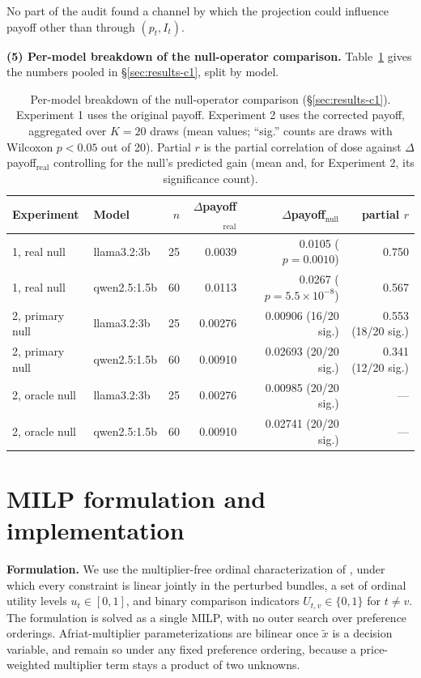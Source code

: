 \documentclass{article}
\begin{document}
No part of the audit found a channel by which the projection could influence payoff other than
through $(p_t, I_t)$.

\textbf{(5) Per-model breakdown of the null-operator comparison.} Table~\ref{tab:permodel} gives
the numbers pooled in \S\ref{sec:results-c1}, split by model.

\begin{table}[h]
\centering
\footnotesize
\caption{Per-model breakdown of the null-operator comparison (\S\ref{sec:results-c1}).
Experiment 1 uses the original payoff. Experiment 2 uses the corrected payoff, aggregated over
$K=20$ draws (mean values; ``sig.'' counts are draws with Wilcoxon $p<0.05$ out of 20). Partial
$r$ is the partial correlation of dose against $\Delta$payoff$_{\mathrm{real}}$ controlling for
the null's predicted gain (mean and, for Experiment 2, its significance count).}
\label{tab:permodel}
\begin{tabular}{llrrrr}
\toprule
Experiment & Model & $n$ & $\Delta$payoff$_{\mathrm{real}}$ & $\Delta$payoff$_{\mathrm{null}}$ & partial $r$ \\
\midrule
1, real null      & llama3.2:3b  & 25 & 0.0039  & 0.0105 ($p=0.0010$)              & 0.750 \\
1, real null      & qwen2.5:1.5b & 60 & 0.0113  & 0.0267 ($p=5.5{\times}10^{-8}$)  & 0.567 \\
\midrule
2, primary null   & llama3.2:3b  & 25 & 0.00276 & 0.00906 (16/20 sig.)             & 0.553 (18/20 sig.) \\
2, primary null   & qwen2.5:1.5b & 60 & 0.00910 & 0.02693 (20/20 sig.)             & 0.341 (12/20 sig.) \\
\midrule
2, oracle null    & llama3.2:3b  & 25 & 0.00276 & 0.00985 (20/20 sig.)             & --- \\
2, oracle null    & qwen2.5:1.5b & 60 & 0.00910 & 0.02741 (20/20 sig.)             & --- \\
\bottomrule
\end{tabular}
\end{table}

\section{MILP formulation and implementation}
\label{app:method-detail}

\textbf{Formulation.} We use the multiplier-free ordinal characterization of
\citet{demuynck2023computing}, under which every constraint is linear jointly in the perturbed
bundles, a set of ordinal utility levels $u_t\in[0,1]$, and binary comparison indicators
$U_{t,v}\in\{0,1\}$ for $t\neq v$. The formulation is solved as a single MILP, with no outer
search over preference orderings. Afriat-multiplier parameterizations are bilinear once
$\tilde{x}$ is a decision variable, and remain so under any fixed preference ordering, because a
price-weighted multiplier term stays a product of two unknowns.
\end{document}
